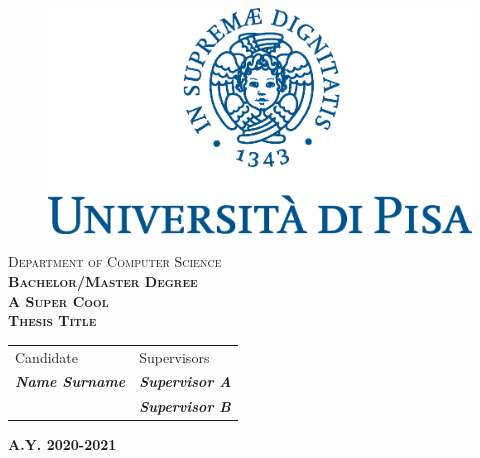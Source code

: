 \documentclass[12pt]{report}
\newcommand{\candidatename}{Name Surname}
\newcommand{\supervisorA}{Supervisor A}
\newcommand{\supervisorB}{Supervisor B}
\newcommand{\department}{Department of Computer Science}
\newcommand{\degree}{Bachelor/Master Degree}
\newcommand{\thesistitle}{A Super Cool\\ Thesis Title}
\begin{document}
\thispagestyle{empty}


\begin{figure}[htb]
  \centering
  \includegraphics[width=\linewidth]{images/marchio_unipi_pant541.eps}
\end{figure}

\begin{center}

    \vspace{-0.5cm}
    \Large
    \textsc{\department}\\
    
    \vspace{0.3cm}
    \large
    \textbf{\textsc{\degree}}\\
    
    \vspace{1cm}
    \Large
    \textbf{\textsc{\thesistitle}}
    \vspace{1.5cm}
    

    \begin{tabularx}{1\textwidth}
        {>{\raggedright\arraybackslash\normalsize}X>{\raggedleft\arraybackslash\normalsize}X}
        Candidate & Supervisors \\
        \textbf{\textit{\candidatename}} & \textbf{\textit{\supervisorA}} \\
        \textbf{\textit{}} & \textbf{\textit{\supervisorB}} \\
    \end{tabularx}
    
    \vfill
    \vspace{0.5cm}
    
    \textbf{\textsc{A.Y. 2020-2021}}\\

\end{center}
\end{document}
